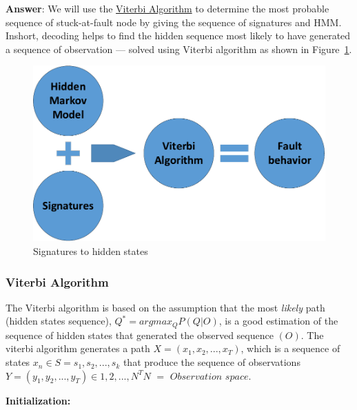 \textbf{Answer}: We will use the \underline{Viterbi Algorithm} to determine the most probable sequence of stuck-at-fault node by giving the sequence of signatures and HMM. Inshort, decoding helps to find the hidden sequence most likely to have generated a sequence of observation --- solved using Viterbi algorithm as shown in Figure~\ref{fig:HMMsig-Vit}.


\begin{figure}[tb!]

 \centering
  \captionsetup{justification=centering}    
   \includegraphics[scale=0.8]{Figures/HMM-plus-viterbi.pdf}
   \caption{Signatures to hidden states}
\label{fig:HMMsig-Vit}
\end{figure}

\subsubsection{Viterbi Algorithm}


The Viterbi algorithm is based on the assumption that the most \textit{likely} path (hidden states sequence), $Q^* = argmax_Q P(Q|O) $, is a good estimation of the sequence of hidden states that generated the observed sequence $(O)$. The viterbi algorithm generates a path $X = (x_1, x_2,...,x_T)$, which is a sequence of states $x_n \in S = {s_1, s_2,...,s_k}$ that produce the sequence of observations $Y = (y_1,y_2,...,y_T) \in {1,2,...,N}^T N$ $=$ $Observation$ $space$.

\textbf{Initialization:}



